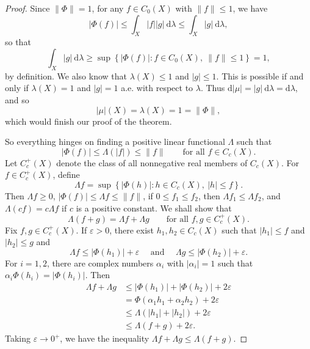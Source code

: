 \documentclass[11pt]{article}
\theoremstyle{thmstyle}
\theoremstyle{defstyle}
\renewcommand{\le}{\leqslant}
\renewcommand{\ge}{\geqslant}
\begin{document}
\begin{proof}
    Since $\|\Phi\| = 1$, for any $f\in C_0(X)$ with $\|f\|\le 1$, we have 
    \begin{equation*}
        |\Phi(f)|\le \int_X |f||g|~\mathrm d\lambda\le \int_X |g|~\mathrm d\lambda,
    \end{equation*}
    so that 
    \begin{equation*}
        \int_X |g|~\mathrm d\lambda\ge\sup\left\{|\Phi(f)|\colon f\in C_0(X),~\|f\|\le 1\right\} = 1,
    \end{equation*}
    by definition. We also know that $\lambda(X)\le 1$ and $|g|\le 1$. This is possible if and only if $\lambda(X) = 1$ and $|g| = 1$ a.e. with respect to $\lambda$. Thus $\mathrm d|\mu| = |g|~\mathrm d\lambda = \mathrm d\lambda$, and so 
    \begin{equation*}
        |\mu|(X) = \lambda(X) = 1 = \|\Phi\|,
    \end{equation*}
    which would finish our proof of the theorem.

    So everything hinges on finding a positive linear functional $\Lambda$ such that 
    \begin{equation*}
        |\Phi(f)|\le \Lambda(|f|)\le \|f\|\qquad\text{for all }f\in C_c(X).
    \end{equation*}
    Let $C_c^+(X)$ denote the class of all nonnegative real members of $C_c(X)$. For $f\in C_c^+(X)$, define 
    \begin{equation*}
        \Lambda f = \sup\left\{|\Phi(h)|\colon h\in C_c(X),~|h|\le f\right\}.
    \end{equation*}
    Then $\Lambda f\ge 0$, $|\Phi(f)|\le\Lambda f\le \|f\|$, if $0\le f_1\le f_2$, then $\Lambda f_1\le \Lambda f_2$, and $\Lambda(cf) = c\Lambda f$ if $c$ is a positive constant. We shall show that 
    \begin{equation*}
        \Lambda(f + g) = \Lambda f + \Lambda g \qquad\text{for all } f,g \in C_c^+(X).
    \end{equation*}
    Fix $f, g\in C_c^+(X)$. If $\varepsilon > 0$, there exist $h_1, h_2\in C_c(X)$ such that $|h_1|\le f$ and $|h_2|\le g$ and 
    \begin{equation*}
        \Lambda f\le |\Phi(h_1)| + \varepsilon\quad\text{ and }\quad\Lambda g\le |\Phi(h_2)| + \varepsilon.
    \end{equation*}
    For $i = 1, 2$, there are complex numbers $\alpha_i$ with $|\alpha_i| = 1$ such that $\alpha_i\Phi(h_i) = |\Phi(h_i)|$. Then 
    \begin{align*}
        \Lambda f + \Lambda g &\le |\Phi(h_1)| + |\Phi(h_2)| + 2\varepsilon\\
        &= \Phi(\alpha_1 h_1 + \alpha_2 h_2) + 2\varepsilon\\
        &\le \Lambda(|h_1| + |h_2|) + 2\varepsilon\\
        &\le \Lambda(f + g) + 2\varepsilon.
    \end{align*}
    Taking $\varepsilon\to 0^+$, we have the inequality $\Lambda f + \Lambda g\le \Lambda(f + g)$.


\end{proof}
\end{document}
